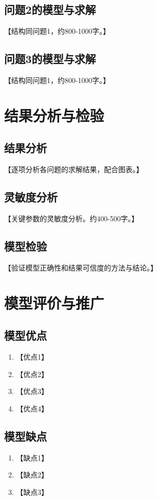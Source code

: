 \documentclass[12pt,a4paper]{ctexart}
\numberwithin{equation}{section}
\numberwithin{figure}{section}
\numberwithin{table}{section}
\begin{document}
\subsection{问题2的模型与求解}
【结构同问题1，约800-1000字。】

\subsection{问题3的模型与求解}
【结构同问题1，约800-1000字。】

\section{结果分析与检验}

\subsection{结果分析}
【逐项分析各问题的求解结果，配合图表。】

\subsection{灵敏度分析}
【关键参数的灵敏度分析。约400-500字。】

\subsection{模型检验}
【验证模型正确性和结果可信度的方法与结论。】

\section{模型评价与推广}

\subsection{模型优点}
\begin{enumerate}
    \item 【优点1】
    \item 【优点2】
    \item 【优点3】
    \item 【优点4】
\end{enumerate}

\subsection{模型缺点}
\begin{enumerate}
    \item 【缺点1】
    \item 【缺点2】
    \item 【缺点3】
\end{enumerate}
\end{document}
